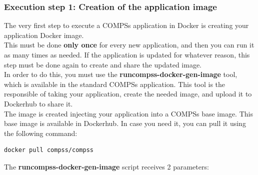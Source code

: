 \subsubsection{Execution step 1: Creation of the application image}
The very first step to execute a COMPSs application in Docker is creating your application Docker image. \\
This must be done \textbf{only once} for every new application, and then you can run it as many times as needed. 
If the application is updated for whatever reason, this step must be done again to create and share 
the updated image. \\
In order to do this, you must use the \textbf{runcompss-docker-gen-image} tool, which is available in the standard COMPSs application.
This tool is the responsible of taking your application, create the needed image, and upload it to Dockerhub to share it. \\
The image is created injecting your application into a COMPSs base image. This base image is available in Dockerhub. 
In case you need it, you can pull it using the following command:
\begin{lstlisting}[language=bash]
docker pull compss/compss
\end{lstlisting}
The \textbf{runcompss-docker-gen-image} script receives 2 parameters:
